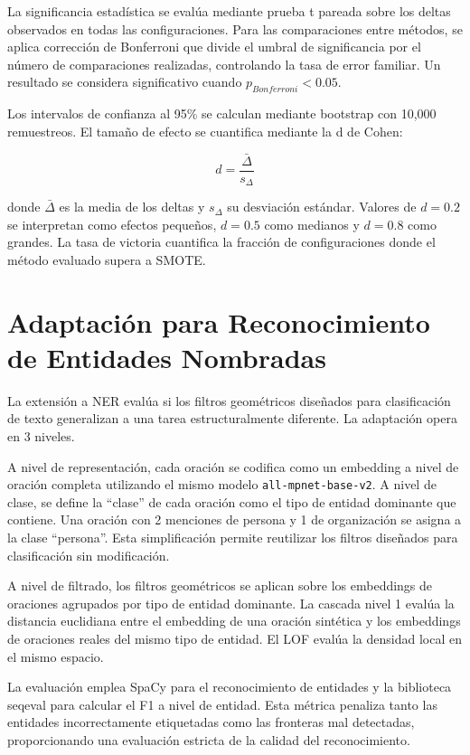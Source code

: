 La significancia estadística se evalúa mediante prueba t pareada sobre los deltas observados en todas las configuraciones. Para las comparaciones entre métodos, se aplica corrección de Bonferroni que divide el umbral de significancia por el número de comparaciones realizadas, controlando la tasa de error familiar. Un resultado se considera significativo cuando $p_{Bonferroni} < 0.05$.

Los intervalos de confianza al 95\% se calculan mediante bootstrap con 10,000 remuestreos. El tamaño de efecto se cuantifica mediante la d de Cohen:

\begin{equation}
d = \frac{\bar{\Delta}}{s_{\Delta}}
\label{eq:cohen_d}
\end{equation}

donde $\bar{\Delta}$ es la media de los deltas y $s_{\Delta}$ su desviación estándar. Valores de $d = 0.2$ se interpretan como efectos pequeños, $d = 0.5$ como medianos y $d = 0.8$ como grandes. La tasa de victoria cuantifica la fracción de configuraciones donde el método evaluado supera a SMOTE.

\section{Adaptación para Reconocimiento de Entidades Nombradas}
\label{sec:adaptacion_ner}

La extensión a NER evalúa si los filtros geométricos diseñados para clasificación de texto generalizan a una tarea estructuralmente diferente. La adaptación opera en 3 niveles.

A nivel de representación, cada oración se codifica como un embedding a nivel de oración completa utilizando el mismo modelo \texttt{all-mpnet-base-v2}. A nivel de clase, se define la ``clase'' de cada oración como el tipo de entidad dominante que contiene. Una oración con 2 menciones de persona y 1 de organización se asigna a la clase ``persona''. Esta simplificación permite reutilizar los filtros diseñados para clasificación sin modificación.

A nivel de filtrado, los filtros geométricos se aplican sobre los embeddings de oraciones agrupados por tipo de entidad dominante. La cascada nivel 1 evalúa la distancia euclidiana entre el embedding de una oración sintética y los embeddings de oraciones reales del mismo tipo de entidad. El LOF evalúa la densidad local en el mismo espacio.

La evaluación emplea SpaCy para el reconocimiento de entidades y la biblioteca seqeval para calcular el F1 a nivel de entidad. Esta métrica penaliza tanto las entidades incorrectamente etiquetadas como las fronteras mal detectadas, proporcionando una evaluación estricta de la calidad del reconocimiento.

